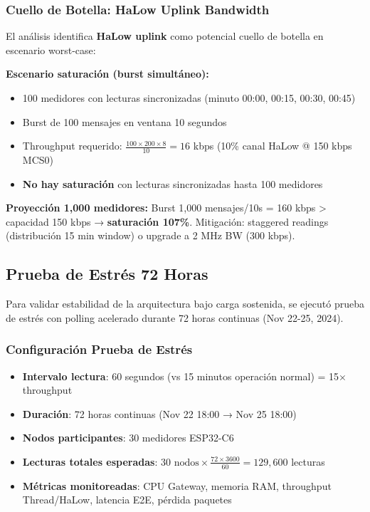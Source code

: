 \subsubsection{Cuello de Botella: HaLow Uplink Bandwidth}

El análisis identifica \textbf{HaLow uplink} como potencial cuello de botella en escenario worst-case:

\textbf{Escenario saturación (burst simultáneo):}

\begin{itemize}
    \item 100 medidores con lecturas sincronizadas (minuto 00:00, 00:15, 00:30, 00:45)
    \item Burst de 100 mensajes en ventana 10 segundos
    \item Throughput requerido: $\frac{100 \times 200 \times 8}{10} = 16$ kbps (10\% canal HaLow @ 150 kbps MCS0)
    \item \textbf{No hay saturación} con lecturas sincronizadas hasta 100 medidores
\end{itemize}

\textbf{Proyección 1,000 medidores:} Burst 1,000 mensajes/10s = 160 kbps > capacidad 150 kbps → \textbf{saturación 107\%}. Mitigación: staggered readings (distribución 15 min window) o upgrade a 2 MHz BW (300 kbps).

\subsection{Prueba de Estrés 72 Horas}
\label{sec:res-estres}

Para validar estabilidad de la arquitectura bajo carga sostenida, se ejecutó prueba de estrés con polling acelerado durante 72 horas continuas (Nov 22-25, 2024).

\subsubsection{Configuración Prueba de Estrés}

\begin{itemize}
    \item \textbf{Intervalo lectura}: 60 segundos (vs 15 minutos operación normal) = 15$\times$ throughput
    \item \textbf{Duración}: 72 horas continuas (Nov 22 18:00 → Nov 25 18:00)
    \item \textbf{Nodos participantes}: 30 medidores ESP32-C6
    \item \textbf{Lecturas totales esperadas}: $30 \text{ nodos} \times \frac{72 \times 3600}{60} = 129,600$ lecturas
    \item \textbf{Métricas monitoreadas}: CPU Gateway, memoria RAM, throughput Thread/HaLow, latencia E2E, pérdida paquetes
\end{itemize}

